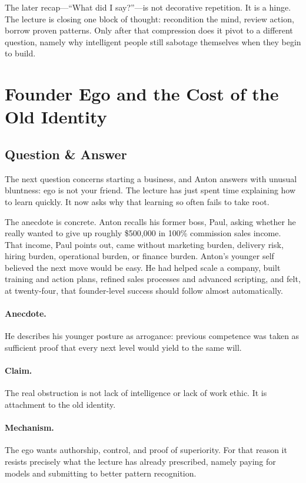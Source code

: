 The later recap---``What did I say?''---is not decorative repetition. It is a hinge. The lecture is closing one block of thought: recondition the mind, review action, borrow proven patterns. Only after that compression does it pivot to a different question, namely why intelligent people still sabotage themselves when they begin to build.

\section{Founder Ego and the Cost of the Old Identity}

\subsection{Question \& Answer}

The next question concerns starting a business, and Anton answers with unusual bluntness: ego is not your friend. The lecture has just spent time explaining how to learn quickly. It now asks why that learning so often fails to take root.

The anecdote is concrete. Anton recalls his former boss, Paul, asking whether he really wanted to give up roughly \$500{,}000 in 100\% commission sales income. That income, Paul points out, came without marketing burden, delivery risk, hiring burden, operational burden, or finance burden. Anton's younger self believed the next move would be easy. He had helped scale a company, built training and action plans, refined sales processes and advanced scripting, and felt, at twenty-four, that founder-level success should follow almost automatically.

\paragraph{Anecdote.}
He describes his younger posture as arrogance: previous competence was taken as sufficient proof that every next level would yield to the same will.

\paragraph{Claim.}
The real obstruction is not lack of intelligence or lack of work ethic. It is attachment to the old identity.

\paragraph{Mechanism.}
The ego wants authorship, control, and proof of superiority. For that reason it resists precisely what the lecture has already prescribed, namely paying for models and submitting to better pattern recognition.

